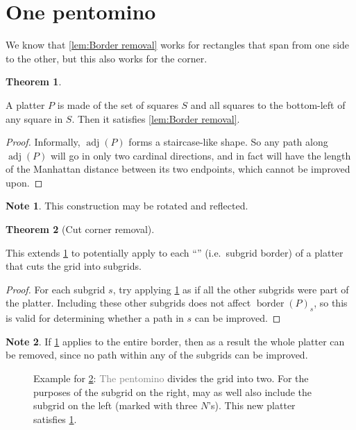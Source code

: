 \documentclass{article}
\newcommand{\pentN}{\smash{\colorbox{colorN!50}{N}}}
\theoremstyle{definition}%
\newtheorem{theorem}{Theorem}[section]
\newtheorem*{note}{Note}
\newcommand{\minordetail}[1]{\textcolor{gray}{#1}}
\newcommand{\badterm}[1]{\textcolor{red}{\uwave{\textcolor{black}{#1}}}}
\newcommand{\adj}{\operatorname{adj}}
\newcommand{\border}{\operatorname{border}}
\begin{document}
\section{One pentomino}

We know that \cref{lem:Border removal} works for rectangles that span from one side to the other, but this also works for the corner.

\begin{theorem}
\label{th:Corner removal}

A platter $P$ is made of the set of squares $S$ and all squares to the bottom-left of any square in $S$. Then it satisfies \cref{lem:Border removal}.
\end{theorem}

\begin{proof}
Informally, $\adj(P)$ forms a staircase-like shape. So any path along $\adj(P)$ will go in only two cardinal directions, and in fact will have the length of the Manhattan distance between its two endpoints, which cannot be improved upon.
\end{proof}

\begin{note}
This construction may be rotated and reflected.
\end{note}

\begin{theorem}[Cut corner removal]
\label{th:Cut corner removal}

This extends \cref{th:Corner removal} to potentially apply to each ``\badterm{side}'' (i.e.\ subgrid border) of a platter that cuts the grid into subgrids.
\end{theorem}

\begin{proof}
For each subgrid $s$, try applying \cref{th:Corner removal} as if all the other subgrids were part of the platter. Including these other subgrids does not affect $\border(P)_s$, so this is valid for determining whether a path in $s$ can be improved.
\end{proof}

\begin{note}
If \cref{th:Corner removal} applies to the entire border, then as a result the whole platter can be removed, since no path within any of the subgrids can be improved.
\end{note}

\begin{figure}[htbp]
    \centering
    \caption{Example for \cref{th:Cut corner removal}: \minordetail{The pentomino} \pentN{} divides the grid into two. For the purposes of the subgrid on the right, \pentN{} may as well also include the subgrid on the left (marked with three $N$'s). This new platter satisfies \cref{th:Corner removal}.}
\end{figure}
\end{document}
